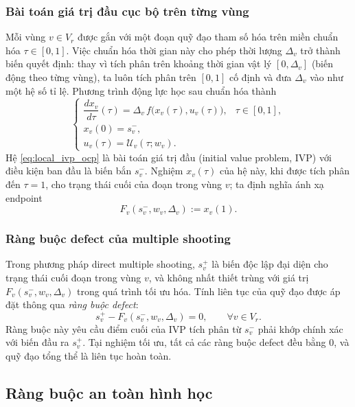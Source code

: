 \subsubsection{Bài toán giá trị đầu cục bộ trên từng vùng}

Mỗi vùng $v\in V_r$ được gắn với một đoạn quỹ đạo tham số hóa trên miền chuẩn hóa $\tau\in[0,1]$. Việc chuẩn hóa thời gian này cho phép thời lượng $\Delta_v$ trở thành biến quyết định: thay vì tích phân trên khoảng thời gian vật lý $[0,\Delta_v]$ (biến động theo từng vùng), ta luôn tích phân trên $[0,1]$ cố định và đưa $\Delta_v$ vào như một hệ số tỉ lệ. Phương trình động lực học sau chuẩn hóa thành
\begin{equation}
\begin{cases}
\dfrac{d x_v}{d\tau}(\tau)=\Delta_v\,f\bigl(x_v(\tau),u_v(\tau)\bigr), & \tau\in[0,1],\\[6pt]
x_v(0)=s_v^-,\\[2pt]
u_v(\tau)=\mathcal{U}_v(\tau;w_v).
\end{cases}
\label{eq:local_ivp_ocp}
\end{equation}
Hệ \eqref{eq:local_ivp_ocp} là bài toán giá trị đầu (initial value problem, IVP) với điều kiện ban đầu là biến bắn $s_v^-$. Nghiệm $x_v(\tau)$ của hệ này, khi được tích phân đến $\tau=1$, cho trạng thái cuối của đoạn trong vùng $v$; ta định nghĩa ánh xạ endpoint
\begin{equation}
F_v(s_v^-,w_v,\Delta_v):=x_v(1).
\label{eq:Fv_ocp}
\end{equation}

\subsubsection{Ràng buộc defect của multiple shooting}

Trong phương pháp direct multiple shooting, $s_v^+$ là biến độc lập đại diện cho trạng thái cuối đoạn trong vùng $v$, và không nhất thiết trùng với giá trị $F_v(s_v^-,w_v,\Delta_v)$ trong quá trình tối ưu hóa. Tính liên tục của quỹ đạo được áp đặt thông qua \emph{ràng buộc defect}:
\begin{equation}
s_v^+ - F_v(s_v^-,w_v,\Delta_v)=0,
\qquad \forall v\in V_r.
\label{eq:defect_ocp}
\end{equation}
Ràng buộc này yêu cầu điểm cuối của IVP tích phân từ $s_v^-$ phải khớp chính xác với biến đầu ra $s_v^+$. Tại nghiệm tối ưu, tất cả các ràng buộc defect đều bằng 0, và quỹ đạo tổng thể là liên tục hoàn toàn.

\subsection{Ràng buộc an toàn hình học}
\label{subsec:safety_constraints}

